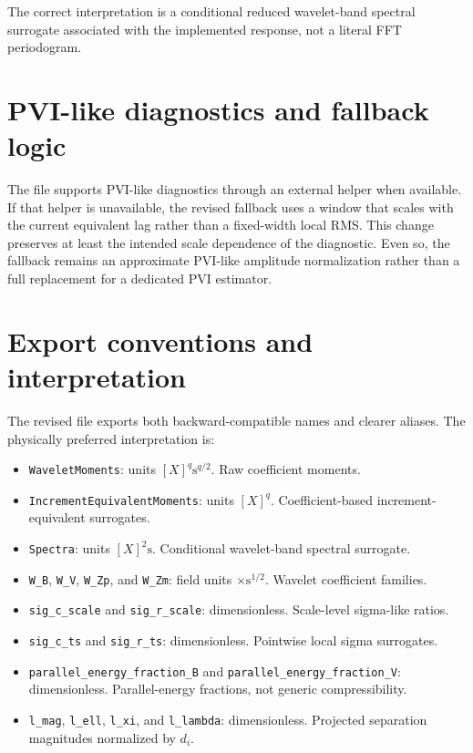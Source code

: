 \documentclass[11pt]{article}
\begin{document}
The correct interpretation is a conditional reduced wavelet-band spectral surrogate associated with the implemented response, not a literal FFT periodogram.

\section{PVI-like diagnostics and fallback logic}

The file supports PVI-like diagnostics through an external helper when available. If that helper is unavailable, the revised fallback uses a window that scales with the current equivalent lag rather than a fixed-width local RMS. This change preserves at least the intended scale dependence of the diagnostic. Even so, the fallback remains an approximate PVI-like amplitude normalization rather than a full replacement for a dedicated PVI estimator.

\section{Export conventions and interpretation}

The revised file exports both backward-compatible names and clearer aliases. The physically preferred interpretation is:
\begin{itemize}[leftmargin=1.6em,itemsep=0.35em]
\item \texttt{WaveletMoments}: units $[X]^q \mathrm{s}^{q/2}$. Raw coefficient moments.
\item \texttt{IncrementEquivalentMoments}: units $[X]^q$. Coefficient-based increment-equivalent surrogates.
\item \texttt{Spectra}: units $[X]^2 \mathrm{s}$. Conditional wavelet-band spectral surrogate.
\item \texttt{W\_B}, \texttt{W\_V}, \texttt{W\_Zp}, and \texttt{W\_Zm}: field units $\times \mathrm{s}^{1/2}$. Wavelet coefficient families.
\item \texttt{sig\_c\_scale} and \texttt{sig\_r\_scale}: dimensionless. Scale-level sigma-like ratios.
\item \texttt{sig\_c\_ts} and \texttt{sig\_r\_ts}: dimensionless. Pointwise local sigma surrogates.
\item \texttt{parallel\_energy\_fraction\_B} and \texttt{parallel\_energy\_fraction\_V}: dimensionless. Parallel-energy fractions, not generic compressibility.
\item \texttt{l\_mag}, \texttt{l\_ell}, \texttt{l\_xi}, and \texttt{l\_lambda}: dimensionless. Projected separation magnitudes normalized by $d_i$.
\end{itemize}
\end{document}
